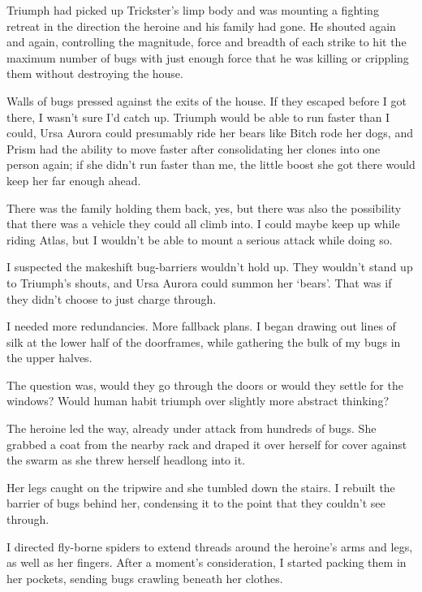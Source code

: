 Triumph had picked up Trickster's limp body and was mounting a fighting retreat in the direction the heroine and his family had gone.  He shouted again and again, controlling the magnitude, force and breadth of each strike to hit the maximum number of bugs with just enough force that he was killing or crippling them without destroying the house.



Walls of bugs pressed against the exits of the house.  If they escaped before I got there, I wasn't sure I'd catch up.  Triumph would be able to run faster than I could, Ursa Aurora could presumably ride her bears like Bitch rode her dogs, and Prism had the ability to move faster after consolidating her clones into one person again; if she didn't run faster than me, the little boost she got there would keep her far enough ahead.



There was the family holding them back, yes, but there was also the possibility that there was a vehicle they could all climb into.  I could maybe keep up while riding Atlas, but I wouldn't be able to mount a serious attack while doing so.



I suspected the makeshift bug-barriers wouldn't hold up.  They wouldn't stand up to Triumph's shouts, and Ursa Aurora could summon her `bears'.  That was if they didn't choose to just charge through.



I needed more redundancies.  More fallback plans.  I began drawing out lines of silk at the lower half of the doorframes, while gathering the bulk of my bugs in the upper halves.



The question was, would they go through the doors or would they settle for the windows?  Would human habit triumph over slightly more abstract thinking?



The heroine led the way, already under attack from hundreds of bugs.  She grabbed a coat from the nearby rack and draped it over herself for cover against the swarm as she threw herself headlong into it.



Her legs caught on the tripwire and she tumbled down the stairs.  I rebuilt the barrier of bugs behind her, condensing it to the point that they couldn't see through.



I directed fly-borne spiders to extend threads around the heroine's arms and legs, as well as her fingers.  After a moment's consideration, I started packing them in her pockets, sending bugs crawling beneath her clothes.



